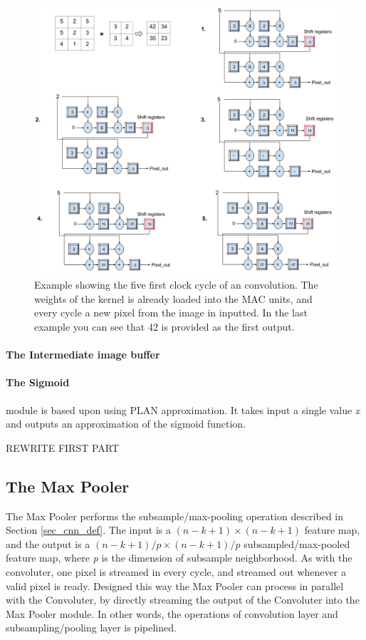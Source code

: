 \begin{figure}[h!]
  \centering
      \includegraphics[width=1.1\textwidth]{Figures/Method/Conv_example}
  \caption{Example showing the five first clock cycle of an convolution. The weights of the kernel is already loaded into the MAC units, and every cycle a new pixel from the image in inputted. In the last example you can see that 42 is provided as the first output.}
\end{figure}

\paragraph{The Intermediate image buffer}

\paragraph{The Sigmoid} module is based upon \cite{Napocensis2009} using PLAN approximation. It takes input a single value \textit{x} and outputs an approximation of the sigmoid function.

\vspace*{1\baselineskip}
REWRITE FIRST PART
\subsection{The Max Pooler} \label{sec_max_pooler}

The Max Pooler performs the subsample/max-pooling operation described in Section \ref{sec_cnn_def}. The input is a $ (n-k+1) \times (n-k+1) $ feature map, and the output is a $ (n-k+1)/p \times (n-k+1)/p $ subsampled/max-pooled feature map, where \textit{p} is the dimension of subsample neighborhood. As with the convoluter, one pixel is streamed in every cycle, and streamed out whenever a valid pixel is ready. Designed this way the Max Pooler can process in parallel with the Convoluter, by directly streaming the output of the Convoluter into the Max Pooler module. In other words, the operations of convolution layer and subsampling/pooling layer is pipelined.


